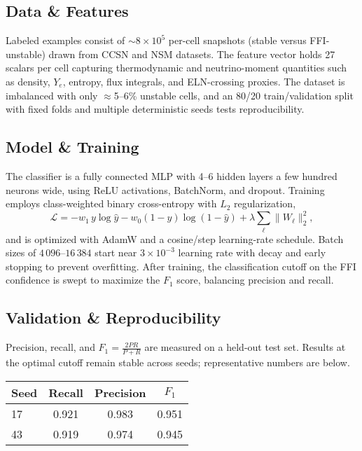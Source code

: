 \documentclass[10pt]{article}
\begin{document}
\begin{center}
\subsection*{Data \& Features}
Labeled examples consist of $\sim 8\times 10^5$ per-cell snapshots (stable versus FFI-unstable) drawn from CCSN and NSM datasets.
The feature vector holds 27 scalars per cell capturing thermodynamic and neutrino-moment quantities such as density, $Y_e$, entropy, flux integrals, and ELN-crossing proxies.
The dataset is imbalanced with only $\approx$5--6\% unstable cells, and an 80/20 train/validation split with fixed folds and multiple deterministic seeds tests reproducibility.

\subsection*{Model \& Training}
The classifier is a fully connected MLP with 4--6 hidden layers a few hundred neurons wide, using ReLU activations, BatchNorm, and dropout.
Training employs class-weighted binary cross-entropy with $L_2$ regularization,
\begin{equation*}
\mathcal{L} = -w_1\, y\log \hat y - w_0 (1-y)\log(1-\hat y) + \lambda \sum_{\ell}\lVert W_\ell\rVert_2^2,
\end{equation*}
and is optimized with AdamW and a cosine/step learning-rate schedule.
Batch sizes of $4\,096$--$16\,384$ start near $3\times 10^{-3}$ learning rate with decay and early stopping to prevent overfitting.
After training, the classification cutoff on the FFI confidence is swept to maximize the $F_1$ score, balancing precision and recall.

\subsection*{Validation \& Reproducibility}
Precision, recall, and $F_1 = \frac{2PR}{P+R}$ are measured on a held-out test set.
Results at the optimal cutoff remain stable across seeds; representative numbers are below.

\begin{center}
\begin{tabular}{@{}lccc@{}}
\toprule
Seed & Recall & Precision & $F_1$ \\\midrule
17 & 0.921 & 0.983 & 0.951 \\
43 & 0.919 & 0.974 & 0.945 \\
\bottomrule
\end{tabular}
\end{center}


\end{center}
\end{document}
